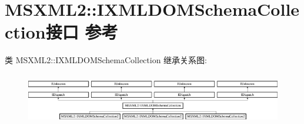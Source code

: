 \hypertarget{interface_m_s_x_m_l2_1_1_i_x_m_l_d_o_m_schema_collection}{}\section{M\+S\+X\+M\+L2\+:\+:I\+X\+M\+L\+D\+O\+M\+Schema\+Collection接口 参考}
\label{interface_m_s_x_m_l2_1_1_i_x_m_l_d_o_m_schema_collection}
类 M\+S\+X\+M\+L2\+:\+:I\+X\+M\+L\+D\+O\+M\+Schema\+Collection 继承关系图\+:\begin{figure}[H]
\begin{center}
\leavevmode
\includegraphics[height=2.267206cm]{interface_m_s_x_m_l2_1_1_i_x_m_l_d_o_m_schema_collection}
\end{center}
\end{figure}
